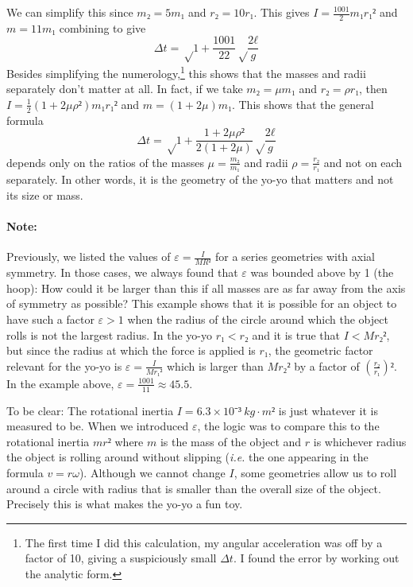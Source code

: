 \begin{example}
\begin{solution}
We can simplify this since $m₂ = 5m₁$ and $r₂ = 10 r₁$.
This gives $I= \frac{1001}2  m₁ r₁²$ and $m = 11m₁$ combining to give
$$
Δt=√{1+\frac {1001}{22}}√{\frac{2ℓ}{g}}
$$
Besides simplifying the numerology,\footnote{The first time I did this calculation, my angular acceleration was off by a factor of 10, giving a suspiciously small $Δt$. I found the error by working out the analytic form.} this shows that the masses and radii separately don't matter at all. In fact, if we take $m₂ = μ m₁$ and $r₂ =ρ r₁$, then $I= \frac12 (1+2μρ²) m₁ r₁²$ and $m= (1+2μ)m₁$. This shows that the general formula 
$$
Δt=√{1+\frac {1+2μρ²}{2(1+2μ)}}√{\frac{2ℓ}{g}}
$$
depends only on the ratios of the masses $μ=\frac{m₂}{m₁}$ and radii $ρ = \frac{r₂}{r₁}$ and not on each separately. In other words, it is the geometry of the yo-yo that matters and not its size or mass. 
\end{solution}
\end{example}

\paragraph{Note:} Previously, we listed the values of $ε = \frac I{MR²}$ for a series geometries with axial symmetry. In those cases, we always found that $ε$ was bounded above by 1 (the hoop): How could it be larger than this if all masses are as far away from the axis of symmetry as possible?
This example shows that it is possible for an object to have such a factor $ε>1$ when the radius of the circle around which the object rolls is not the largest radius. In the yo-yo $r₁<r₂$ and it is true that $I < Mr₂²$, but since the radius at which the force is applied is $r₁$, the geometric factor relevant for the yo-yo is $ε = \frac I{Mr₁²}$ which is larger than $Mr₂²$ by a factor of $\left( \frac{r₂}{r₁}\right)²$. In the example above, $ε = \frac {1001}{11} ≈ 45.5$. 

To be clear: The rotational inertia $I = 6.3 × 10⁻³\ kg \cdot m²$ is just whatever it is measured to be. When we introduced $ε$, the logic was to compare this to the rotational inertia $mr²$ where $m$ is the mass of the object and $r$ is whichever radius the object is rolling around without slipping ({\it i.e.} the one appearing in the formula $v=r ω$). Although we cannot change $I$, some geometries allow us to roll around a circle with radius that is smaller than the overall size of the object. Precisely this is what makes the yo-yo a fun toy.

